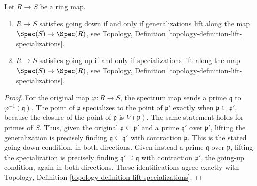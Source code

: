 \begin{lemma}
\label{editorial-source-lemma-going-up-down-specialization}
Let $R \to S$ be a ring map.
\begin{enumerate}
\item $R \to S$ satisfies going down if and only if
generalizations lift along the map $\Spec(S) \to \Spec(R)$,
see Topology, Definition \ref{topology-definition-lift-specializations}.
\item $R \to S$ satisfies going up if and only if
specializations lift along the map $\Spec(S) \to \Spec(R)$,
see Topology, Definition \ref{topology-definition-lift-specializations}.
\end{enumerate}
\end{lemma}

\begin{proof}
For the original map $\varphi:R\to S$, the spectrum map
sends a prime $\mathfrak q$ to $\varphi^{-1}(\mathfrak q)$.
The point of $\mathfrak p$ specializes to the point of
$\mathfrak p'$ exactly when $\mathfrak p\subseteq\mathfrak p'$,
because the closure of the point of $\mathfrak p$ is
$V(\mathfrak p)$. The same statement holds for primes of $S$.
Thus, given the original $\mathfrak p\subseteq\mathfrak p'$
and a prime $\mathfrak q'$ over $\mathfrak p'$, lifting
the generalization is precisely finding
$\mathfrak q\subseteq\mathfrak q'$ with contraction
$\mathfrak p$. This is the stated going-down condition,
in both directions. Given instead a prime $\mathfrak q$
over $\mathfrak p$, lifting the specialization is precisely
finding $\mathfrak q'\supseteq\mathfrak q$ with contraction
$\mathfrak p'$, the going-up condition, again in both
directions. These identifications agree exactly with
Topology, Definition \ref{topology-definition-lift-specializations}.
\end{proof}